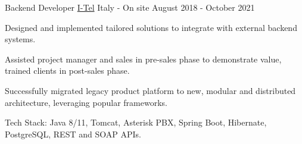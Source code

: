 \begin{cventries}

\cventry
    {Backend Developer} %
    {\href{https://i-tel.it}{I-Tel}} %
    {Italy - On site} %
    {August 2018 - October 2021} %
    {
      	\begin{cvitems}
      		\item {Designed and implemented tailored solutions to integrate with external backend systems.}
      		\item {Assisted project manager and sales in pre-sales phase to demonstrate value, trained clients in post-sales phase.}
      		\item {Successfully migrated legacy product platform to new, modular and distributed architecture, leveraging popular frameworks.}
      		\item {Tech Stack: Java 8/11, Tomcat, Asterisk PBX, Spring Boot, Hibernate, PostgreSQL, REST and SOAP APIs.}
      	\end{cvitems}
    }


\end{cventries}
